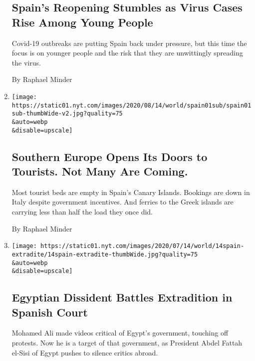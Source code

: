 \begin{enumerate}
  \hypertarget{spains-reopening-stumbles-as-virus-cases-rise-among-young-people}{%
  \subsection{Spain's Reopening Stumbles as Virus Cases Rise Among Young
  People}\label{spains-reopening-stumbles-as-virus-cases-rise-among-young-people}}

  Covid-19 outbreaks are putting Spain back under pressure, but this
  time the focus is on younger people and the risk that they are
  unwittingly spreading the virus.

  By Raphael Minder
\item
  \href{/2020/07/19/world/europe/tourism-virus-europe.html}{}

  \texttt{[image: https://static01.nyt.com/images/2020/08/14/world/spain01sub/spain01sub-thumbWide-v2.jpg?quality=75\\\&auto=webp\\\&disable=upscale]}

  \hypertarget{southern-europe-opens-its-doors-to-tourists-not-many-are-coming}{%
  \subsection{Southern Europe Opens Its Doors to Tourists. Not Many Are
  Coming.}\label{southern-europe-opens-its-doors-to-tourists-not-many-are-coming}}

  Most tourist beds are empty in Spain's Canary Islands. Bookings are
  down in Italy despite government incentives. And ferries to the Greek
  islands are carrying less than half the load they once did.

  By Raphael Minder
\item
  \href{/2020/07/14/world/middleeast/egypt-dissident-extradition-spain.html}{}

  \texttt{[image: https://static01.nyt.com/images/2020/07/14/world/14spain-extradite/14spain-extradite-thumbWide.jpg?quality=75\\\&auto=webp\\\&disable=upscale]}

  \hypertarget{egyptian-dissident-battles-extradition-in-spanish-court}{%
  \subsection{Egyptian Dissident Battles Extradition in Spanish
  Court}\label{egyptian-dissident-battles-extradition-in-spanish-court}}

  Mohamed Ali made videos critical of Egypt's government, touching off
  protests. Now he is a target of that government, as President Abdel
  Fattah el-Sisi of Egypt pushes to silence critics abroad.


\end{enumerate}
